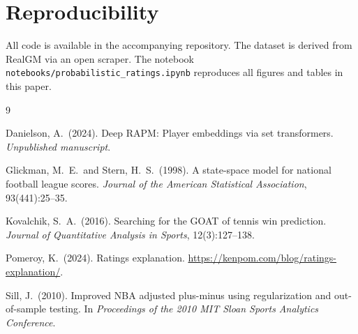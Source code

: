 \documentclass[11pt]{article}
\begin{document}
\section*{Reproducibility}

All code is available in the accompanying repository.  The dataset is derived
from RealGM via an open scraper.  The notebook
\texttt{notebooks/probabilistic\_ratings.ipynb} reproduces all figures and
tables in this paper.


\begin{thebibliography}{9}

Danielson, A.\ (2024).
\newblock Deep RAPM: Player embeddings via set transformers.
\newblock \emph{Unpublished manuscript}.

Glickman, M.~E.\ and Stern, H.~S.\ (1998).
\newblock A state-space model for national football league scores.
\newblock \emph{Journal of the American Statistical Association},
  93(441):25--35.

Kovalchik, S.~A.\ (2016).
\newblock Searching for the GOAT of tennis win prediction.
\newblock \emph{Journal of Quantitative Analysis in Sports}, 12(3):127--138.

Pomeroy, K.\ (2024).
\newblock Ratings explanation.
\newblock \url{https://kenpom.com/blog/ratings-explanation/}.

Sill, J.\ (2010).
\newblock Improved NBA adjusted plus-minus using regularization and
  out-of-sample testing.
\newblock In \emph{Proceedings of the 2010 MIT Sloan Sports Analytics
  Conference}.

\end{thebibliography}
\end{document}
